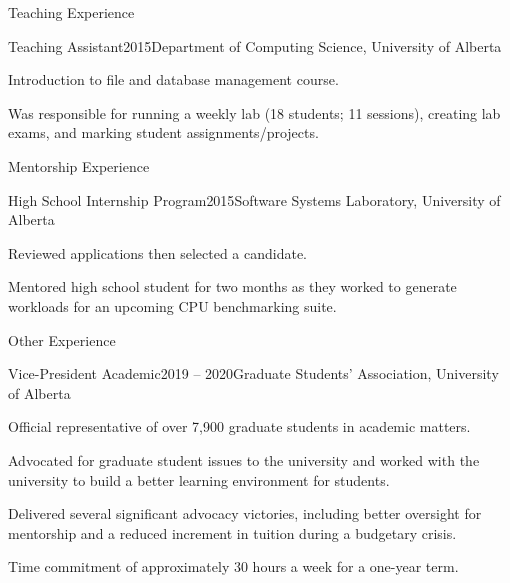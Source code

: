 \documentclass{cv}
\begin{document}

\begin{rSection}{Teaching Experience}

\begin{rSubsection}{Teaching Assistant}{2015}{Department of Computing Science, University of Alberta}
\item Introduction to file and database management course.
\item Was responsible for running a weekly lab (18 students; 11 sessions), creating lab exams, and marking student assignments/projects.
\end{rSubsection}

\end{rSection}


\begin{rSection}{Mentorship Experience}

\begin{rSubsection}{High School Internship Program}{2015}{Software Systems Laboratory, University of Alberta}
\item Reviewed applications then selected a candidate.
\item Mentored high school student for two months as they worked to generate workloads for an upcoming CPU benchmarking suite.
\end{rSubsection}

\end{rSection}


\begin{rSection}{Other Experience}

\begin{rSubsection}{Vice-President Academic}{2019 -- 2020}{Graduate Students' Association, University of Alberta}
\item Official representative of over 7,900 graduate students in academic matters.
\item Advocated for graduate student issues to the university and worked with the university to build a better learning environment for students.
\item Delivered several significant advocacy victories, including better oversight for mentorship and a reduced increment in tuition during a budgetary crisis.
\item Time commitment of approximately 30 hours a week for a one-year term.
\end{rSubsection}

\end{rSection}
\end{document}

